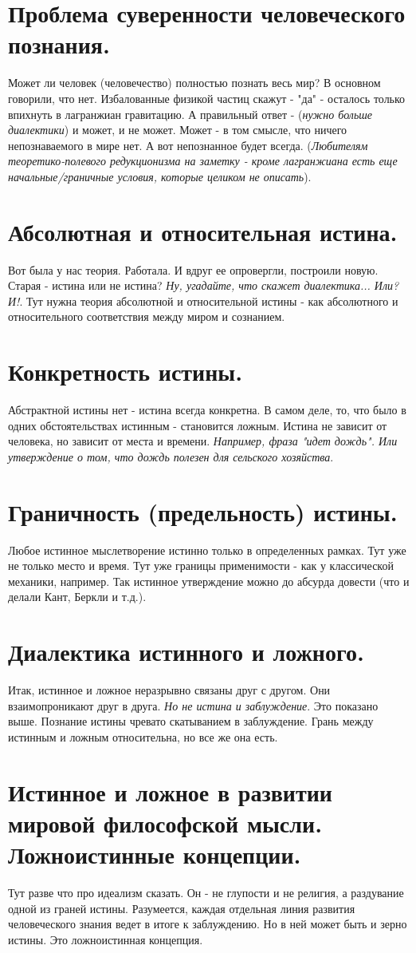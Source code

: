 \section{ Проблема суверенности человеческого познания.}
Может ли человек (человечество) полностью познать весь мир? В основном говорили, что нет. Избалованные физикой частиц скажут - "да" - осталось только впихнуть в лагранжиан гравитацию. А правильный ответ - (\textit{нужно больше диалектики}) и может, и не может. Может - в том смысле, что ничего непознаваемого в мире нет. А вот непознанное будет всегда. (\textit{Любителям теоретико-полевого редукционизма на заметку - кроме лагранжиана есть еще начальные/граничные условия, которые целиком не описать}).

\section{ Абсолютная и относительная истина.}
Вот была у нас теория. Работала. И вдруг ее опровергли, построили новую. Старая - истина или не истина? \textit{Ну, угадайте, что скажет диалектика... Или? И!}. Тут нужна теория абсолютной и относительной истины - как абсолютного и относительного соответствия между миром и сознанием. 

\section{ Конкретность истины.}
Абстрактной истины нет - истина всегда конкретна. В самом деле, то, что было в одних обстоятельствах истинным - становится ложным. Истина не зависит от человека, но зависит от места и времени. \textit{Например, фраза "идет дождь". Или утверждение о том, что дождь полезен для сельского хозяйства}.

\section{ Граничность (предельность) истины.}
Любое истинное мыслетворение истинно только в определенных рамках. Тут уже не только место и время. Тут уже границы применимости - как у классической механики, например. Так истинное утверждение можно до абсурда довести (что и делали Кант, Беркли и т.д.).

\section{ Диалектика истинного и ложного.}
Итак, истинное и ложное неразрывно связаны друг с другом. Они взаимопроникают друг в друга. \textit{Но не истина и заблуждение}. Это показано выше. Познание истины чревато скатыванием в заблуждение. Грань между истинным и ложным относительна, но все же она есть.

\section{ Истинное и ложное в развитии мировой философской мысли. Ложноистинные концепции.}
Тут разве что про идеализм сказать. Он - не глупости и не религия, а раздувание одной из граней истины. Разумеется, каждая отдельная линия развития человеческого знания ведет в итоге к заблуждению. Но в ней может быть и зерно истины. Это ложноистинная концепция.
 